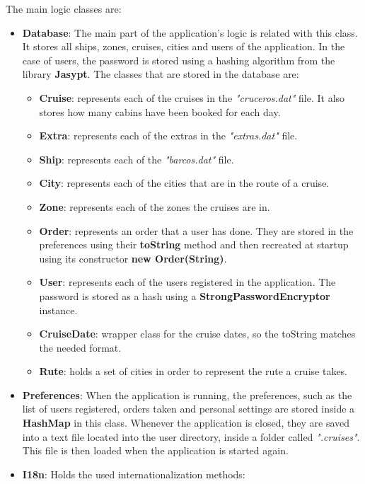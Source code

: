 \documentclass[11pt]{article}
\begin{document}
	The main logic classes are:
	\begin{itemize}
		\item \textbf{Database}: The main part of the application's logic is related with this class. It stores all ships, zones, cruises, cities and users of the application. In the case of users, the password is stored using a hashing algorithm from the library \textbf{Jasypt}. The classes that are stored in the database are:
		\begin{itemize}
			\item \textbf{Cruise}: represents each of the cruises in the \textit{"cruceros.dat"} file. It also stores how many cabins have been booked for each day.
			\item \textbf{Extra}: represents each of the extras in the \textit{"extras.dat"} file.
			\item \textbf{Ship}: represents each of the \textit{"barcos.dat"} file.
			\item \textbf{City}: represents each of the cities that are in the route of a cruise.
			\item \textbf{Zone}: represents each of the zones the cruises are in.
			\item \textbf{Order}: represents an order that a user has done. They are stored in the  preferences using their \textbf{toString} method and then recreated at startup using its constructor\textbf{ new Order(String)}.
			\item \textbf{User}: represents each of the users registered in the application. The password is stored as a hash using a \textbf{StrongPasswordEncryptor} instance.
			\item \textbf{CruiseDate}: wrapper class for the cruise dates, so the toString matches the needed format.
			\item \textbf{Rute}: holds a set of cities in order to represent the rute a cruise takes.
		\end{itemize}
		\item \textbf{Preferences}: When the application is running, the preferences, such as the list of users registered, orders taken and personal settings are stored inside a \textbf{HashMap} in this class. Whenever the application is closed, they are saved into a text file located into the user directory, inside a folder called \textit{".cruises"}. This file is then loaded when the application is started again.
		\item \textbf{I18n}: Holds the used internationalization methods:
		\begin{itemize}

\end{itemize}
\end{itemize}
\end{document}
